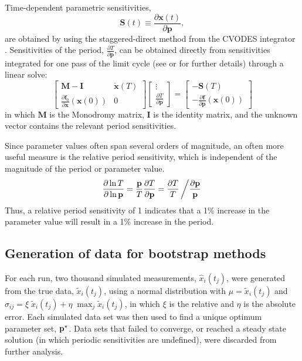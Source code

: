 Time-dependent parametric sensitivities, $$\mathbf{S}(t) \equiv \frac{\partial
  {\bm x}(t)}{\partial {\bm p}}, $$ are obtained by using the staggered-direct method from
the CVODES integrator \cite{Serban2005}. Sensitivities of the period,
$\frac{\partial T}{\partial {\bm p}}$, can be obtained directly from sensitivities
integrated for one pass of the limit cycle (see \cite{Wilkins2009} or
\cite{Kramer1984} for further details) through a linear solve:
\begin{equation}
  \left[\begin{array}{cc} \mathbf{M} - \mathbf{I} & \dot{{\bm x}}(T) \\
      \frac{\partial {\bm f}_0}{\partial
    {\bm x}}({\bm x}(0)) & 0
  \end{array}\right]
  \left[\begin{array}{c} \vdots \\ \frac{\partial T}{\partial {\bm p}}
  \end{array}\right] =
  \left[\begin{array}{c} -\mathbf{S}(T) \\ -\frac{\partial {\bm f}}{\partial {\bm p}}({\bm x}(0))
  \end{array}\right]
\end{equation} in which $\mathbf{M}$ is the Monodromy matrix, $\mathbf{I}$ is the identity matrix,
and the unknown vector contains the relevant period sensitivities.

Since parameter values often span several orders of magnitude, an often more
useful measure is the relative period sensitivity, which is independent of the
magnitude of the period or parameter value.
\begin{equation}
  \frac{\partial \ln T}{\partial \ln {\mathbf{p}}} = \frac{{\mathbf{p}}}{T}\frac{\partial T}{\partial {\mathbf{p}}} = \frac{\partial T}{T} \left/ \frac{\partial {\mathbf{p}}}{{\mathbf{p}}} \right.
\end{equation}
Thus, a relative period sensitivity of 1 indicates that a 1\% increase in the
parameter value will result in a 1\% increase in the period.

\subsection{Generation of data for bootstrap methods}
For each run, two thousand simulated measurements, $\hat{x}_i(t_j)$, were
generated from the true data, $\tilde{x}_i(t_j)$, using a normal distribution
with $\mu = \tilde{x}_i(t_j)$ and $\sigma_{ij} = \xi\;\tilde{x}_i(t_j) +
\eta\;\max_j{\tilde{x}_i(t_j)}$, in which $\xi$ is the relative and $\eta$ is
the absolute error. Each simulated data set was then used to find a unique
optimum parameter set, ${\mathbf{p}}^\star$. Data sets that failed to converge, or reached
a steady state solution (in which periodic sensitivities are undefined), were discarded from further analysis.

